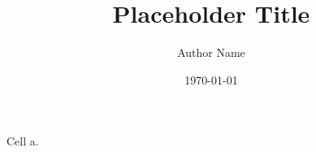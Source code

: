 \documentclass[english,type=bachelor-thesis,license=CCBY,paper=a4,twoside,print]{thesis}
\title{Placeholder Title}
\author{Author Name}
\date{\today}
\begin{document}
\frontmatter
\maketitle
Cell a.
\gdef\SatexReachedEnd{}
\gdef\SatexReachedEnd{}
\end{document}
